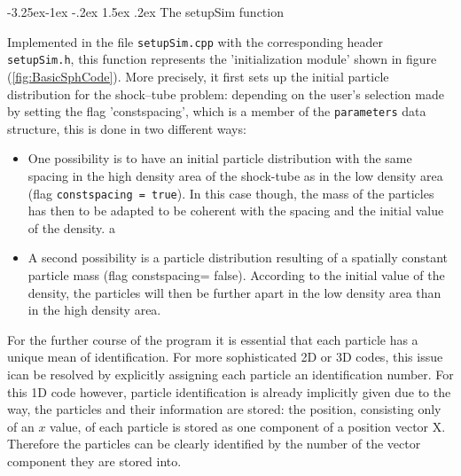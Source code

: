 \documentclass[11pt,a4paper,twoside]{report}
\makeatletter
\renewcommand\paragraph{\@startsection{paragraph}{4}{\z@}%
  {-3.25ex\@plus -1ex \@minus -.2ex}%
  {1.5ex \@plus .2ex}%
  {\normalfont\normalsize\bfseries}}
\makeatother
\begin{document}
\paragraph{The setupSim function}
\label{sec:1DSPHcode_functions_setupSim}

Implemented in the file {\tt setupSim.cpp} with the corresponding header {\tt setupSim.h}, this function represents the 'initialization module' shown in figure (\ref{fig:BasicSphCode}). More precisely, it first sets up the initial particle distribution for the shock--tube problem: depending on the user's selection made by setting the flag 'constspacing', which is a member of the {\tt parameters} data structure, this is done in two different ways:
\begin{itemize}
 \item One possibility is to have an initial particle distribution with the same spacing in the high density area of the shock-tube as in the low density area (flag {\tt constspacing = true}). In this case though, the mass of the particles has then to be adapted to be coherent with the spacing and the initial value of the density.
 a\item A second possibility is a particle distribution resulting of a spatially constant particle mass (flag constspacing= false). According to the initial value of the density, the particles will then be further apart in the low density area than in the high density area.
\end{itemize}
For the further course of the program it is essential that each particle has a unique mean of identification. For more sophisticated 2D or 3D codes, this issue ican be resolved by explicitly assigning each particle an identification number. For this 1D code however, particle identification is already implicitly given due to the way, the particles and their information are stored: the position, consisting only of an $x$ value, of each particle is stored as one component of a position vector X. Therefore the particles can be clearly identified by the number of the vector component they are stored into.
\end{document}
